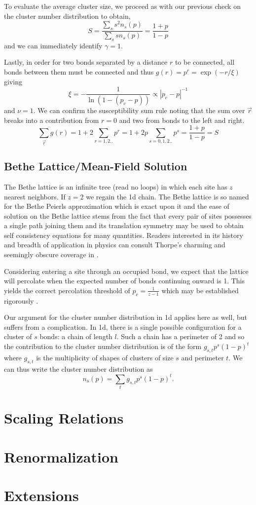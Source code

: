 To evaluate the average cluster size, we proceed as with our previous check on
the cluster number distribution to obtain,
\[S = \frac{\sum_s s^2n_s(p)}{\sum_s sn_s(p)} = \frac{1+p}{1-p}\]
and we can immediately identify $\gamma=1$.

Lastly, in order for two bonds separated by a distance $r$ to be connected, all
bonds between them must be connected and thus \(g(r) = p^r = \exp(-r/\xi)\) giving
\[\xi = -\frac{1}{\ln(1 - (p_c - p))}\propto |p_c - p|^{-1}\]
and $\nu = 1$.  We can confirm the susceptibility sum rule noting that the sum over
$\vec{r}$ breaks into a contribution from $r=0$ and two from bonds to the left and
right.
\[\sum_{\vec{r}}g(r) = 1 + 2\sum_{r=1,2..} p^r = 
1 + 2p\sum_{s=0,1,2..} p^s= \frac{1+p}{1-p} = S\]

\subsection{Bethe Lattice/Mean-Field Solution}

The Bethe lattice is an infinite tree (read no loops) in which each site has
$z$ nearest neighbors.  If $z=2$ we regain the 1d chain. The Bethe lattice is 
so named for the Bethe Peierls
approximation which is exact upon it and the ease of solution on the Bethe lattice stems
from the fact that every pair of sites possesses a single path joining them and its
translation symmetry may be used to obtain self consistency equations for many
quantities. Readers interested in its history and breadth of application in physics
can consult Thorpe's charming and seemingly obscure coverage in \cite{thorpe82}.

Considering entering a site through an occupied bond, we expect that the lattice will
percolate when the expected number of bonds continuing onward is 1.  This yields the
correct percolation threshold of $p_c = \frac{1}{z-1}$ which may be established
rigorously \cite{fisher61}.

Our argument for the cluster number distribution in 1d applies here as well,
but suffers from a complication.  In 1d, there is a single possible
configuration for a cluster of $s$ bonds: a chain of length $l$.  Such a chain
has a perimeter of 2 and so the contribution to the cluster number
distribution is of the form $g_{s,t}p^s(1-p)^t$ where $g_{s,t}$ is the
multiplicity of shapes of clusters of size $s$ and perimeter $t$.  We can
thus write the cluster number distribution as
\[n_s(p) = \sum_t g_{s,t}p^s(1-p)^t.\]


\section{Scaling Relations}
\section{Renormalization}
\section{Extensions}

